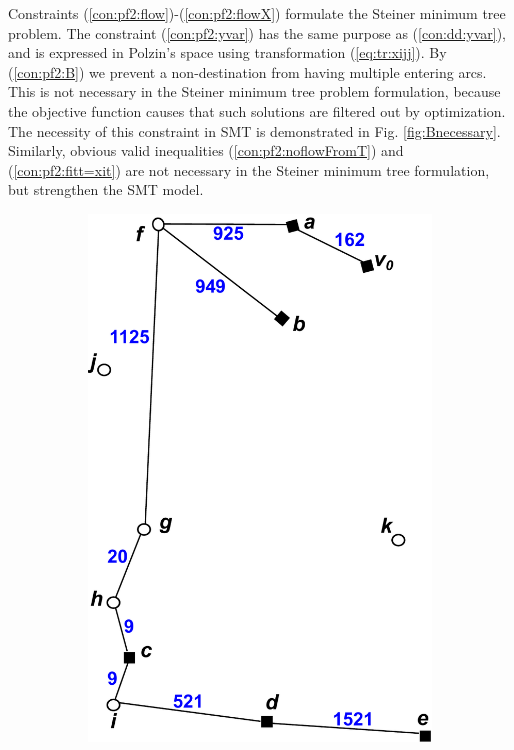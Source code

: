     Constraints (\ref{con:pf2:flow})-(\ref{con:pf2:flowX}) formulate the Steiner minimum tree problem. The constraint (\ref{con:pf2:yvar}) has the same purpose as (\ref{con:dd:yvar}), and is expressed in Polzin's space using transformation (\ref{eq:tr:xijj}). By (\ref{con:pf2:B}) we prevent a non-destination from having multiple entering arcs. This is not necessary in the Steiner minimum tree problem formulation, because the objective function causes that such solutions are filtered out by optimization. The necessity of this constraint in SMT is demonstrated in Fig. \ref{fig:Bnecessary}. Similarly, obvious valid inequalities (\ref{con:pf2:noflowFromT}) and (\ref{con:pf2:fitt=xit}) are not necessary in the Steiner minimum tree formulation, but strengthen the SMT model.
\begin{figure}
    \centering
    \begin{subfigure}[b]{0.4\textwidth}
        \includegraphics[width=\textwidth]{conBNec}

\end{subfigure}
\end{figure}
